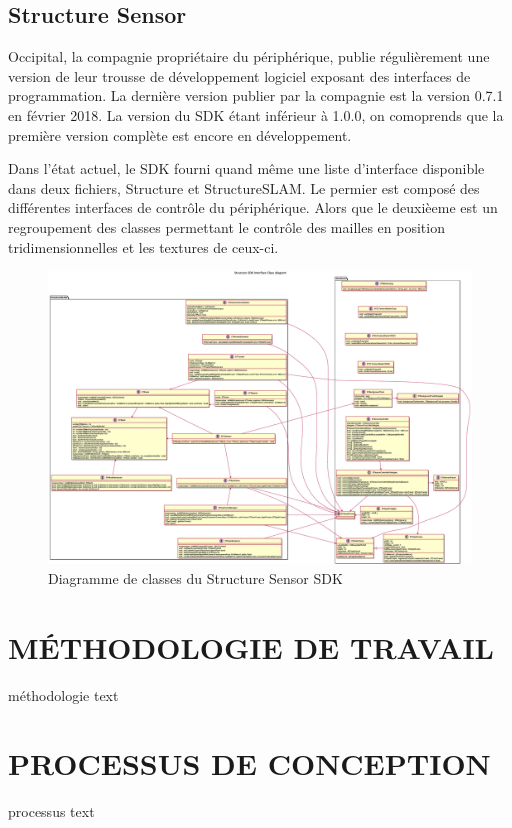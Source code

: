 \documentclass[letterpaper,twoside,12pt,french]{report}
\begin{document}
\section*{Structure Sensor}
Occipital, la compagnie propriétaire du périphérique, publie régulièrement une version de leur
trousse de développement logiciel exposant des interfaces de programmation. La dernière version
publier par la compagnie est la version 0.7.1 en février 2018. \citep*{occipitalsdk} La version du
SDK étant inférieur à 1.0.0, on comoprends que la première version complète est encore en
développement.
\par
Dans l'état actuel, le SDK fourni quand même une liste d'interface disponible dans deux fichiers,
Structure et StructureSLAM. Le permier est composé des différentes interfaces de contrôle du
périphérique. Alors que le deuxièeme est un regroupement des classes permettant le contrôle des
mailles en position tridimensionnelles et les textures de ceux-ci.
\par
\begin{figure}
\includegraphics[width=\textwidth]{StructureClassDiagram.eps}
\centering
    \caption{Diagramme de classes du Structure Sensor SDK}
\end{figure}
\chapter*{\uppercase{Méthodologie de travail}}
méthodologie text
\chapter*{\uppercase{Processus de conception}}
processus text
\end{document}
